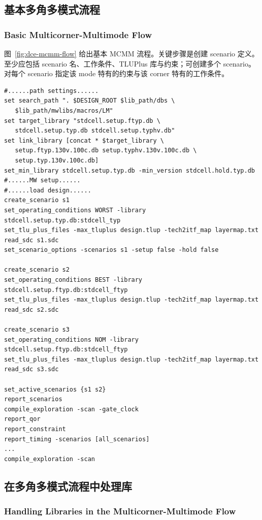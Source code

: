 \subsection{基本多角多模式流程}
\subsubsection*{Basic Multicorner-Multimode Flow}

图~\ref{fig:dce-mcmm-flow} 给出基本 MCMM 流程。关键步骤是创建 scenario 定义。至少应包括 scenario 名、工作条件、TLUPlus 库与约束；可创建多个 scenario。对每个 scenario 指定该 mode 特有的约束与该 corner 特有的工作条件。


\begin{lstlisting}[caption={运行多角多模式流程的基本脚本}]
#......path settings......
set search_path ". $DESIGN_ROOT $lib_path/dbs \
   $lib_path/mwlibs/macros/LM"
set target_library "stdcell.setup.ftyp.db \
   stdcell.setup.typ.db stdcell.setup.typhv.db"
set link_library [concat * $target_library \
   setup.ftyp.130v.100c.db setup.typhv.130v.100c.db \
   setup.typ.130v.100c.db]
set_min_library stdcell.setup.typ.db -min_version stdcell.hold.typ.db
#......MW setup......
#......load design......
create_scenario s1
set_operating_conditions WORST -library stdcell.setup.typ.db:stdcell_typ
set_tlu_plus_files -max_tluplus design.tlup -tech2itf_map layermap.txt
read_sdc s1.sdc
set_scenario_options -scenarios s1 -setup false -hold false

create_scenario s2
set_operating_conditions BEST -library stdcell.setup.ftyp.db:stdcell_ftyp
set_tlu_plus_files -max_tluplus design.tlup -tech2itf_map layermap.txt
read_sdc s2.sdc

create_scenario s3
set_operating_conditions NOM -library stdcell.setup.ftyp.db:stdcell_ftyp
set_tlu_plus_files -max_tluplus design.tlup -tech2itf_map layermap.txt
read_sdc s3.sdc

set_active_scenarios {s1 s2}
report_scenarios
compile_exploration -scan -gate_clock
report_qor
report_constraint
report_timing -scenarios [all_scenarios]
...
compile_exploration -scan
\end{lstlisting}

\subsection{在多角多模式流程中处理库}
\subsubsection*{Handling Libraries in the Multicorner-Multimode Flow}

